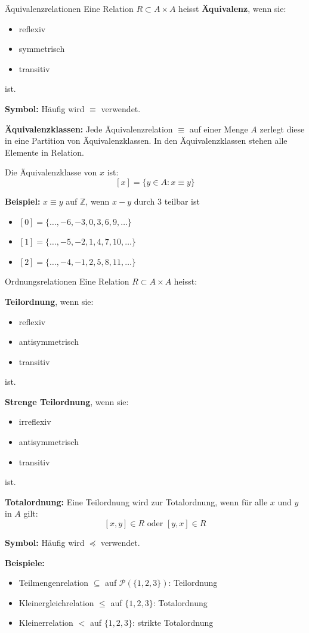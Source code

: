 \documentclass[a4paper, fontsize=7pt]{scrartcl}
\def\Z{\mathbb{Z}}  %
\begin{document}
\begin{mainbox}{\"Aquivalenzrelationen}
Eine Relation $R \subset A \times A$ heisst \textbf{\"Aquivalenz}, wenn sie:
\begin{itemize}
    \item reflexiv
    \item symmetrisch
    \item transitiv
\end{itemize}
ist.

\textbf{Symbol:} H\"aufig wird $\equiv$ verwendet.

\textbf{\"Aquivalenzklassen:}
Jede \"Aquivalenzrelation $\equiv$ auf einer Menge $A$ zerlegt diese in eine Partition von \"Aquivalenzklassen. In den \"Aquivalenzklassen stehen alle Elemente in Relation.

Die \"Aquivalenzklasse von $x$ ist:
$$[x] = \{y \in A : x \equiv y\}$$

\textbf{Beispiel:} $x \equiv y$ auf $\Z$, wenn $x - y$ durch 3 teilbar ist
\begin{itemize}
    \item $[0] = \{\ldots, -6, -3, 0, 3, 6, 9, \ldots\}$
    \item $[1] = \{\ldots, -5, -2, 1, 4, 7, 10, \ldots\}$
    \item $[2] = \{\ldots, -4, -1, 2, 5, 8, 11, \ldots\}$
\end{itemize}
\end{mainbox}

\begin{mainbox}{Ordnungsrelationen}
Eine Relation $R \subset A \times A$ heisst:

\textbf{Teilordnung}, wenn sie:
\begin{itemize}
    \item reflexiv
    \item antisymmetrisch
    \item transitiv
\end{itemize}
ist.

\textbf{Strenge Teilordnung}, wenn sie:
\begin{itemize}
    \item irreflexiv
    \item antisymmetrisch
    \item transitiv
\end{itemize}
ist.

\textbf{Totalordnung:}
Eine Teilordnung wird zur Totalordnung, wenn f\"ur alle $x$ und $y$ in $A$ gilt:
$$[x, y] \in R \text{ oder } [y, x] \in R$$

\textbf{Symbol:} H\"aufig wird $\preceq$ verwendet.

\textbf{Beispiele:}
\begin{itemize}
    \item Teilmengenrelation $\subseteq$ auf $\mathcal{P}(\{1, 2, 3\})$: Teilordnung
    \item Kleinergleichrelation $\leq$ auf $\{1, 2, 3\}$: Totalordnung
    \item Kleinerrelation $<$ auf $\{1, 2, 3\}$: strikte Totalordnung
\end{itemize}
\end{mainbox}
\end{document}
